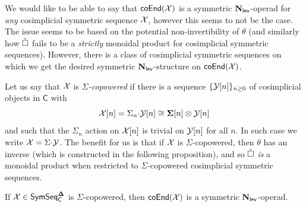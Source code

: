 \begin{remark} \label{def:Sigma-copowered}
    We would like to be able to say that $\mathsf{coEnd}(\mathcal{X})$ is a symmetric $\mathbf{N}_{\mathsf{lev}}$-operad for \textit{any} cosimplicial symmetric sequence $\mathcal{X}$, however this seems to not be the case. The issue seems to be based on the potential non-invertibility of $\theta$ (and similarly how $\mathring{\square}$ fails to be a \textit{strictly} monoidal product for cosimplicial symmetric sequences). However, there is a class of cosimplicial symmetric sequences on which we get the desired symmetric $\mathbf{N}_{\mathsf{lev}}$-structure on $\mathsf{coEnd}(\mathcal{\mathcal{X}})$. 
    
    Let us say that $\mathcal{X}$ is \textit{$\Sigma$-copowered} if there is a sequence $\{\mathcal{Y}[n]\}_{n\geq 0}$ of cosimplicial objects in $\mathsf{C}$ with \[ \mathcal{X}[n] = \Sigma_n {\cdot} \mathcal{Y}[n] \cong \mathbf{\Sigma}[n]\otimes \mathcal{Y}[n]\]
    and such that the $\Sigma_n$ action on $\mathcal{X}[n]$ is trivial on $\mathcal{Y}[n]$ for all $n$. In such case we write $\mathcal{X}= \Sigma {\cdot} \mathcal{Y}$. The benefit for us is that if $\mathcal{X}$ is $\Sigma$-copowered, then $\theta$ has an inverse (which is constructed in the following proposition), and so $\mathring{\square}$ \textit{is} a monoidal product when restricted to $\Sigma$-copowered cosimplicial symmetric sequences.
\end{remark}


\begin{proposition} \label{prop:coend-X}
    If $\mathcal{X}\in \mathsf{SymSeq}_{\mathsf{C}}^{\mathbf{\Delta}}$ is $\Sigma$-copowered, then $\mathsf{coEnd}(\mathcal{X})$ is a symmetric $\mathbf{N}_{\mathsf{lev}}$-operad.
\end{proposition}

